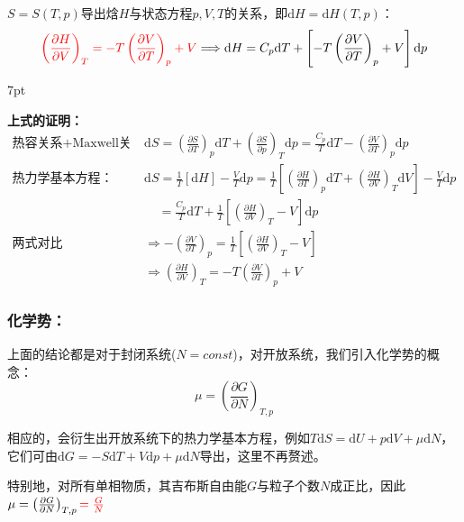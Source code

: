\documentclass[zihao=-4,UTF8]{report}
\newenvironment{graybox}{%
\def\FrameCommand{%
\hspace{1pt}%
{\color{gray}\small \vrule width 2pt}%
{\color{graybox_color}\vrule width 4pt}%
\colorbox{graybox_color}%
}%
\MakeFramed{\advance\hsize-\width\FrameRestore}%
\noindent\hspace{-4.55pt}%
\begin{adjustwidth}{}{7pt}%
\vspace{2pt}\vspace{2pt}%
}
{%
\vspace{2pt}\end{adjustwidth}\endMakeFramed%
}
\begin{document}
\noindent{} $S = S(T,p)$导出焓$H$与状态方程$p,V,T$的关系，即$\mathrm{d}H = \mathrm{d}H(T,p)$：
\begin{equation}
    {\color{red}\left(\frac{\partial H }{\partial V }\right)_{T} = - T\left(\frac{\partial V }{\partial T }\right)_{p} +V}\Longrightarrow \mathrm{d}H = C_p\mathrm{d}T + \left[- T\left(\frac{\partial V }{\partial T }\right)_{p} +V\right]\mathrm{d}p 
\end{equation}
\begin{graybox}
\textbf{上式的证明：}
\begin{align*}
    \text{热容关系+Maxwell关系：}&\mathrm{d}S = \left(\frac{\partial S }{\partial T }\right)_{p}\mathrm{d}T + \left(\frac{\partial S }{\partial p }\right)_{T}\mathrm{d}p=\frac{C_p}{T}\mathrm{d}T - \left(\frac{\partial V }{\partial T }\right)_{p}\mathrm{d}p\\ 
    \text{热力学基本方程：}&\mathrm{d}S =\frac{1}{T}\left[\mathrm{d}H\right] - \frac{V}{T}\mathrm{d}p = \frac{1}{T}\left[ \left(\frac{\partial H }{\partial T  }\right)_{p}\mathrm{d}T + \left(\frac{\partial H }{\partial V }\right)_{T}\mathrm{d}V \right] - \frac{V}{T}\mathrm{d}p \\ 
    &\ \ \ \ \ = \frac{C_p}{T}\mathrm{d}T + \frac{1}{T} \left[\left(\frac{\partial H }{\partial V }\right)_{T} - V\right]\mathrm{d}p\\ 
    \text{两式对比}\ &\Longrightarrow - \left(\frac{\partial V }{\partial T }\right)_{p} =  \frac{1}{T} \left[\left(\frac{\partial H }{\partial V }\right)_{T} - V\right]\\ 
    &\Longrightarrow \left(\frac{\partial H }{\partial V }\right)_{T} = - T\left(\frac{\partial V }{\partial T }\right)_{p} +V
\end{align*}
\end{graybox}

\subsubsection{化学势：}
上面的结论都是对于封闭系统($N = const$)，对开放系统，我们引入化学势的概念：
\begin{equation*}
    \mu = \left(\frac{\partial G }{\partial N }\right)_{T,p}
\end{equation*}
{\par\color{gray}\small
相应的，会衍生出开放系统下的热力学基本方程，例如$T\mathrm{d}S = \mathrm{d}U + p\mathrm{d}V +\mu\mathrm{d}N$，它们可由$\mathrm{d}G = -S\mathrm{d}T +V\mathrm{d}p + \mu\mathrm{d}N$导出，这里不再赘述。\par
\par}
特别地，对所有单相物质，其吉布斯自由能$G$与粒子个数$N$成正比，因此$ \mu = \left(\frac{\partial G }{\partial N }\right)_{T,p} {\color{red}= \frac{G}{N}}$
\end{document}
